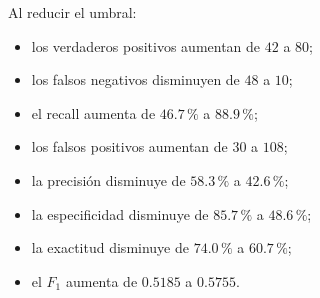 \begin{table}[H]
    \centering
    \caption{Desempeño del modelo logístico bajo los umbrales
    \(0.50\) y \(1/6\).}
    \label{tab:comparacion-umbrales}

    \footnotesize
\end{table}

Al reducir el umbral:

\begin{itemize}
    \item los verdaderos positivos aumentan de \(42\) a \(80\);

    \item los falsos negativos disminuyen de \(48\) a \(10\);

    \item el recall aumenta de \(46.7\,\%\) a \(88.9\,\%\);

    \item los falsos positivos aumentan de \(30\) a \(108\);

    \item la precisión disminuye de \(58.3\,\%\) a \(42.6\,\%\);

    \item la especificidad disminuye de \(85.7\,\%\) a \(48.6\,\%\);

    \item la exactitud disminuye de \(74.0\,\%\) a \(60.7\,\%\);

    \item el \(F_1\) aumenta de \(0.5185\) a \(0.5755\).
\end{itemize}

